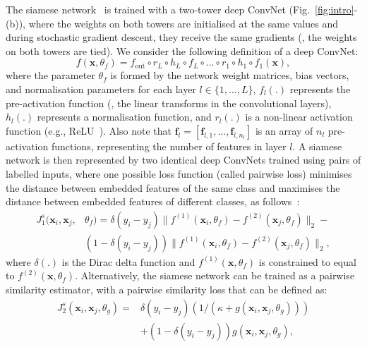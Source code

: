 \documentclass[10pt,twocolumn,letterpaper]{article}
\begin{document}
The siamese network~\cite{bromley1993signature,Han_cvpr15,masci2014descriptor,ZagoruykoCVPR15} is trained with a two-tower deep ConvNet (Fig.~\ref{fig:intro}-(b)), where the weights on both towers are initialised at the same values and during stochastic gradient descent, they receive the same gradients (\ie, the weights on both towers are tied).  We consider the following definition of a deep ConvNet:
\begin{equation}
f(\mathbf{x},\theta_f) = f_{\text{out}} \circ r_{L} \circ h_L \circ f_L \circ ... \circ r_1 \circ h_1 \circ f_1(\mathbf{x}),
\label{eq:def_CNN}
\end{equation}
where the parameter $\theta_f$ is formed by the network weight matrices, bias vectors, and normalisation parameters for each layer $l \in \{1,...,L\}$, $f_l(.)$ represents the pre-activation function (\ie, the linear transforms in the convolutional layers), $h_l(.)$ represents a normalisation function, and $r_l(.)$ is a non-linear activation function (e.g., ReLU~\cite{nair2010rectified}).  Also note that $\mathbf{f}_l = [\mathbf{f}_{l,1},...,\mathbf{f}_{l,n_l}]$ is an array of $n_l$ pre-activation functions, representing the number of features in layer $l$.
A siamese network is then represented by two identical deep ConvNets trained using pairs of labelled inputs, where one possible loss function (called pairwise loss) minimises the distance between embedded features of the same class and maximises the distance between embedded features of different classes, as follows~\cite{chopra2005learning,masci2014descriptor}:
\begin{equation}
\begin{split}
J_1^s( \mathbf{x}_i,\mathbf{x}_j, & \theta_f ) = \delta(y_i-y_j)\| f^{(1)}(\mathbf{x}_i, \theta_f) - f^{(2)}(\mathbf{x}_j, \theta_f) \|_2   - \\
& (1 - \delta(y_i-y_j))\| f^{(1)}(\mathbf{x}_i, \theta_f) - f^{(2)}(\mathbf{x}_j, \theta_f) \|_2, 
\end{split}
\label{eq:loss_siamese_embedding}
\end{equation}
where $\delta(.)$ is the Dirac delta function and $f^{(1)}(\mathbf{x},\theta_f)$ is constrained to equal to $f^{(2)}(\mathbf{x},\theta_f)$.  Alternatively, the siamese network can be trained as a pairwise similarity estimator, with a pairwise similarity loss that can be defined as:
\begin{equation}
\begin{split}
J_2^s( \mathbf{x}_i,\mathbf{x}_j, \theta_g ) = & \delta(y_i-y_j)   (1/(\kappa+g(\mathbf{x}_i, \mathbf{x}_j, \theta_g ) ))   \\
&+(1 - \delta(y_i-y_j))g(\mathbf{x}_i, \mathbf{x}_j, \theta_g ) , 
\end{split}
\label{eq:loss_siamese_classifier}
\end{equation}
\end{document}
